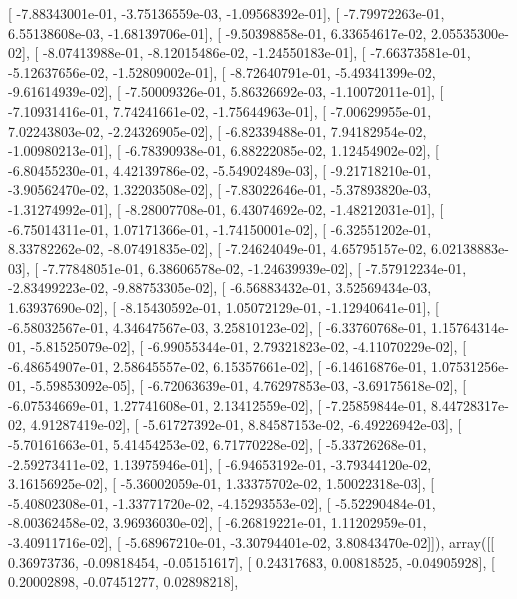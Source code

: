 \documentclass{article}
\begin{document}
       [ -7.88343001e-01,  -3.75136559e-03,  -1.09568392e-01],
       [ -7.79972263e-01,   6.55138608e-03,  -1.68139706e-01],
       [ -9.50398858e-01,   6.33654617e-02,   2.05535300e-02],
       [ -8.07413988e-01,  -8.12015486e-02,  -1.24550183e-01],
       [ -7.66373581e-01,  -5.12637656e-02,  -1.52809002e-01],
       [ -8.72640791e-01,  -5.49341399e-02,  -9.61614939e-02],
       [ -7.50009326e-01,   5.86326692e-03,  -1.10072011e-01],
       [ -7.10931416e-01,   7.74241661e-02,  -1.75644963e-01],
       [ -7.00629955e-01,   7.02243803e-02,  -2.24326905e-02],
       [ -6.82339488e-01,   7.94182954e-02,  -1.00980213e-01],
       [ -6.78390938e-01,   6.88222085e-02,   1.12454902e-02],
       [ -6.80455230e-01,   4.42139786e-02,  -5.54902489e-03],
       [ -9.21718210e-01,  -3.90562470e-02,   1.32203508e-02],
       [ -7.83022646e-01,  -5.37893820e-03,  -1.31274992e-01],
       [ -8.28007708e-01,   6.43074692e-02,  -1.48212031e-01],
       [ -6.75014311e-01,   1.07171366e-01,  -1.74150001e-02],
       [ -6.32551202e-01,   8.33782262e-02,  -8.07491835e-02],
       [ -7.24624049e-01,   4.65795157e-02,   6.02138883e-03],
       [ -7.77848051e-01,   6.38606578e-02,  -1.24639939e-02],
       [ -7.57912234e-01,  -2.83499223e-02,  -9.88753305e-02],
       [ -6.56883432e-01,   3.52569434e-03,   1.63937690e-02],
       [ -8.15430592e-01,   1.05072129e-01,  -1.12940641e-01],
       [ -6.58032567e-01,   4.34647567e-03,   3.25810123e-02],
       [ -6.33760768e-01,   1.15764314e-01,  -5.81525079e-02],
       [ -6.99055344e-01,   2.79321823e-02,  -4.11070229e-02],
       [ -6.48654907e-01,   2.58645557e-02,   6.15357661e-02],
       [ -6.14616876e-01,   1.07531256e-01,  -5.59853092e-05],
       [ -6.72063639e-01,   4.76297853e-03,  -3.69175618e-02],
       [ -6.07534669e-01,   1.27741608e-01,   2.13412559e-02],
       [ -7.25859844e-01,   8.44728317e-02,   4.91287419e-02],
       [ -5.61727392e-01,   8.84587153e-02,  -6.49226942e-03],
       [ -5.70161663e-01,   5.41454253e-02,   6.71770228e-02],
       [ -5.33726268e-01,  -2.59273411e-02,   1.13975946e-01],
       [ -6.94653192e-01,  -3.79344120e-02,   3.16156925e-02],
       [ -5.36002059e-01,   1.33375702e-02,   1.50022318e-03],
       [ -5.40802308e-01,  -1.33771720e-02,  -4.15293553e-02],
       [ -5.52290484e-01,  -8.00362458e-02,   3.96936030e-02],
       [ -6.26819221e-01,   1.11202959e-01,  -3.40911716e-02],
       [ -5.68967210e-01,  -3.30794401e-02,   3.80843470e-02]]), array([[ 0.36973736, -0.09818454, -0.05151617],
       [ 0.24317683,  0.00818525, -0.04905928],
       [ 0.20002898, -0.07451277,  0.02898218],
\end{document}
